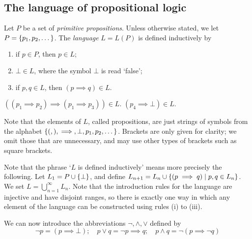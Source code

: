 \subsection{The language of propositional logic}
Let \( P \) be a set of \emph{primitive propositions}.
Unless otherwise stated, we let \( P = \qty{p_1, p_2, \dots } \).
The \emph{language} \( L = L(P) \) is defined inductively by
\begin{enumerate}
    \item if \( p \in P \), then \( p \in L \);
    \item \( \bot \in L \), where the symbol \( \bot \) is read `false';
    \item if \( p, q \in L \), then \( (p \implies q) \in L \).
\end{enumerate}
\begin{example}
    \( ((p_1 \implies p_2) \implies (p_1 \implies p_3)) \in L \).
    \( (p_4 \implies \bot) \in L \).
\end{example}
\begin{remark}
    Note that the elements of \( L \), called propositions, are just strings of symbols from the alphabet \( \qty{(, ), \implies, \bot, p_1, p_2, \dots} \).
    Brackets are only given for clarity; we omit those that are unnecessary, and may use other types of brackets such as square brackets.

    Note that the phrase `\( L \) is defined inductively' means more precisely the following.
    Let \( L_1 = P \cup \qty{\bot} \), and define \( L_{n+1} = L_n \cup \qty{(p \implies q) \mid p, q \in L_n} \).
    We set \( L = \bigcup_{n=1}^\infty L_n \).
    Note that the introduction rules for the language are injective and have disjoint ranges, so there is exactly one way in which any element of the language can be constructed using rules (i) to (iii).
\end{remark}
We can now introduce the abbreviations \( \neg, \wedge, \vee \) defined by
\[ \neg p = (p \implies \bot);\quad p \vee q = \neg p \implies q;\quad p \wedge q = \neg (p \implies \neg q) \]
